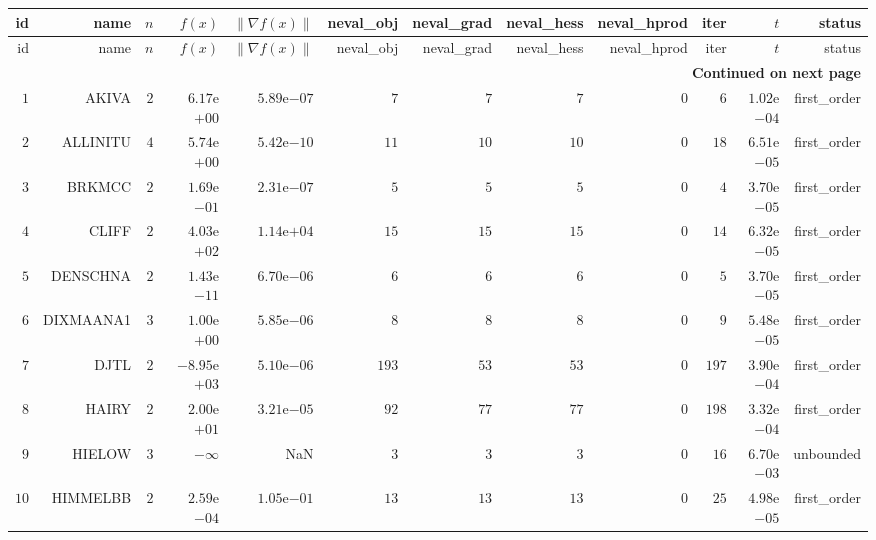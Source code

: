 \begin{longtable}{rrrrrrrrrrrr}
  \hline
  id & name & \(n\) & \(f(x)\) & \(\|\nabla f(x)\|\) & neval\_obj & neval\_grad & neval\_hess & neval\_hprod & iter & \(t\) & status \\\hline
  \endfirsthead
  \hline
  id & name & \(n\) & \(f(x)\) & \(\|\nabla f(x)\|\) & neval\_obj & neval\_grad & neval\_hess & neval\_hprod & iter & \(t\) & status \\\hline
  \endhead
  \hline
  \multicolumn{12}{r}{{\bfseries Continued on next page}}\\
  \hline
  \endfoot
  \endlastfoot
  \(     1\) & AKIVA & \(     2\) & \( 6.17\)e\(+00\) & \( 5.89\)e\(-07\) & \(     7\) & \(     7\) & \(     7\) & \(     0\) & \(     6\) & \( 1.02\)e\(-04\) & first\_order \\
  \(     2\) & ALLINITU & \(     4\) & \( 5.74\)e\(+00\) & \( 5.42\)e\(-10\) & \(    11\) & \(    10\) & \(    10\) & \(     0\) & \(    18\) & \( 6.51\)e\(-05\) & first\_order \\
  \(     3\) & BRKMCC & \(     2\) & \( 1.69\)e\(-01\) & \( 2.31\)e\(-07\) & \(     5\) & \(     5\) & \(     5\) & \(     0\) & \(     4\) & \( 3.70\)e\(-05\) & first\_order \\
  \(     4\) & CLIFF & \(     2\) & \( 4.03\)e\(+02\) & \( 1.14\)e\(+04\) & \(    15\) & \(    15\) & \(    15\) & \(     0\) & \(    14\) & \( 6.32\)e\(-05\) & first\_order \\
  \(     5\) & DENSCHNA & \(     2\) & \( 1.43\)e\(-11\) & \( 6.70\)e\(-06\) & \(     6\) & \(     6\) & \(     6\) & \(     0\) & \(     5\) & \( 3.70\)e\(-05\) & first\_order \\
  \(     6\) & DIXMAANA1 & \(     3\) & \( 1.00\)e\(+00\) & \( 5.85\)e\(-06\) & \(     8\) & \(     8\) & \(     8\) & \(     0\) & \(     9\) & \( 5.48\)e\(-05\) & first\_order \\
  \(     7\) & DJTL & \(     2\) & \(-8.95\)e\(+03\) & \( 5.10\)e\(-06\) & \(   193\) & \(    53\) & \(    53\) & \(     0\) & \(   197\) & \( 3.90\)e\(-04\) & first\_order \\
  \(     8\) & HAIRY & \(     2\) & \( 2.00\)e\(+01\) & \( 3.21\)e\(-05\) & \(    92\) & \(    77\) & \(    77\) & \(     0\) & \(   198\) & \( 3.32\)e\(-04\) & first\_order \\
  \(     9\) & HIELOW & \(     3\) & \(-\infty\) &       NaN & \(     3\) & \(     3\) & \(     3\) & \(     0\) & \(    16\) & \( 6.70\)e\(-03\) & unbounded \\
  \(    10\) & HIMMELBB & \(     2\) & \( 2.59\)e\(-04\) & \( 1.05\)e\(-01\) & \(    13\) & \(    13\) & \(    13\) & \(     0\) & \(    25\) & \( 4.98\)e\(-05\) & first\_order \\

\end{longtable}
